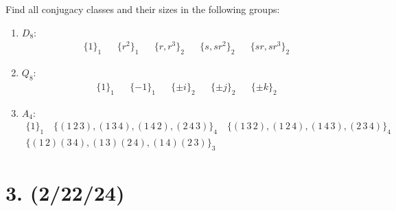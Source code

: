 \documentclass{article}
\begin{document}
Find all conjugacy classes and their sizes in the following groups:
\begin{enumerate}[label=(\alph*), itemsep=0em]
    \item $D_8$:
        \begin{align*}
            \{ 1 \}_1 & & \{ r^2 \}_1 & & \{ r, r^3 \}_2 & & \{ s, sr^2 \}_2 & & \{ sr, sr^3 \}_2
        \end{align*}
    \item $Q_8$:
        \begin{align*}
            \{ 1 \}_1 & & \{ -1 \}_1 & & \{ \pm{i} \}_2 & & \{ \pm{j} \}_2 & & \{ \pm{k} \}_2
        \end{align*}
    \item $A_4$:
        \begin{gather*}
            \{ 1 \}_1 \hspace{1em} \{ (1\, 2\, 3), (1\, 3\, 4), (1\, 4\, 2), (2\, 4\, 3) \}_4 \hspace{1em} \{ (1\, 3\, 2), (1\, 2\, 4), (1\, 4\, 3), (2\, 3\, 4) \}_4 \\ \{ (1\, 2)(3\, 4), (1\, 3)(2\, 4), (1\, 4)(2\, 3) \}_3
        \end{gather*}
\end{enumerate}

\section*{3. (2/22/24)}
\end{document}
